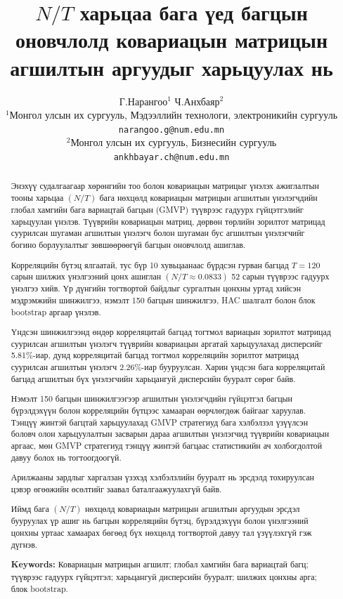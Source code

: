 \documentclass[11pt,a4paper]{article}
\title{
	\textbf{$N/T$ харьцаа бага үед багцын оновчлолд ковариацын матрицын агшилтын аргуудыг харьцуулах нь}
}
\author{
	Г.Нарангоо$^{1}$ \qquad Ч.Анхбаяр$^{2}$\\
	\small $^{1}$Монгол улсын их сургууль, Мэдээллийн технологи, электроникийн сургууль\\
	\small \texttt{narangoo.g@num.edu.mn}\\
	\small $^{2}$Монгол улсын их сургууль, Бизнесийн сургууль\\
	\small \texttt{ankhbayar.ch@num.edu.mn}
}
\date{}
\begin{document}
	
	\maketitle
		
		\begin{abstract}
			
			Энэхүү судалгаагаар хөрөнгийн тоо болон ковариацын
			матрицыг үнэлэх ажиглалтын тооны харьцаа $(N/T)$
			бага нөхцөлд ковариацын матрицын агшилтын
			үнэлэгчдийн глобал хамгийн бага вариацтай
			багцын (GMVP) түүврээс гадуурх гүйцэтгэлийг
			харьцуулан үнэлэв. Түүврийн ковариацын матриц,
			дөрвөн төрлийн зорилтот матрицад суурилсан
			шугаман агшилтын үнэлэгч болон шугаман бус
			агшилтын үнэлэгчийг богино борлуулалтыг
			зөвшөөрөөгүй багцын оновчлолд ашиглав.
			
			Корреляцийн бүтэц ялгаатай, тус бүр 10
			хувьцаанаас бүрдсэн гурван багцад
			$T=120$ сарын шилжих үнэлгээний цонх
			ашиглан $(N/T\approx0.0833)$
			52 сарын түүврээс гадуурх үнэлгээ хийв.
			Үр дүнгийн тогтвортой байдлыг сургалтын
			цонхны уртад хийсэн мэдрэмжийн шинжилгээ,
			нэмэлт 150 багцын шинжилгээ, HAC шалгалт
			болон блок bootstrap аргаар үнэлэв.
			
			Үндсэн шинжилгээнд өндөр корреляцитай
			багцад тогтмол вариацын зорилтот
			матрицад суурилсан агшилтын үнэлэгч
			түүврийн ковариацын аргатай харьцуулахад
			дисперсийг 5.81\%-иар, дунд корреляцитай
			багцад тогтмол корреляцийн зорилтот
			матрицад суурилсан агшилтын үнэлэгч
			2.26\%-иар бууруулсан. Харин үндсэн
			бага корреляцитай багцад агшилтын бүх
			үнэлэгчийн харьцангуй дисперсийн
			бууралт сөрөг байв.
			
			Нэмэлт 150 багцын шинжилгээгээр
			агшилтын үнэлэгчдийн гүйцэтгэл
			багцын бүрэлдэхүүн болон корреляцийн
			бүтцээс хамааран өөрчлөгдөж байгааг
			харуулав. Тэнцүү жинтэй багцтай
			харьцуулахад GMVP стратегиуд
			бага хэлбэлзэл үзүүлсэн боловч
			олон харьцуулалтын засварын дараа
			агшилтын үнэлэгчид түүврийн
			ковариацын аргаас, мөн GMVP
			стратегиуд тэнцүү жинтэй багцаас
			статистикийн ач холбогдолтой
			давуу болох нь тогтоогдоогүй.
			
			Арилжааны зардлыг харгалзан үзэхэд
			хэлбэлзлийн бууралт нь эрсдэлд
			тохируулсан цэвэр өгөөжийн өсөлтийг
			заавал баталгаажуулахгүй байв.
			
			Иймд бага $(N/T)$ нөхцөлд
			ковариацын матрицын агшилтын
			аргуудын эрсдэл бууруулах үр ашиг
			нь багцын корреляцийн бүтэц,
			бүрэлдэхүүн болон үнэлгээний
			цонхны уртаас хамаарах бөгөөд
			бүх нөхцөлд тогтвортой давуу
			тал үзүүлэхгүй гэж дүгнэв.
			
			\medskip
			
			\noindent
			\textbf{Keywords:}
			Ковариацын матрицын агшилт;
			глобал хамгийн бага вариацтай багц;
			түүврээс гадуурх гүйцэтгэл;
			харьцангуй дисперсийн бууралт;
			шилжих цонхны арга;
			блок bootstrap.
			
		\end{abstract}

	

	

%








	
\end{document}
